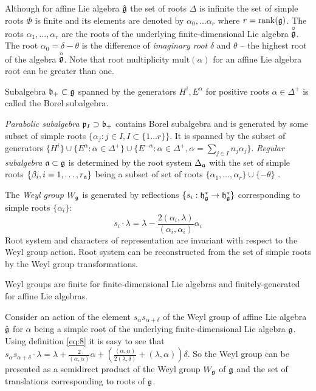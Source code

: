 Although for affine Lie algebra $\hat{\mathfrak{g}}$ the set of roots $\Delta$ is infinite the set of simple roots $\Phi$ is finite and its elements are denoted by $\alpha_{0},\dots \alpha_{r}$ where $r=\mathrm{rank}(\mathfrak{g})$. The roots $\alpha_1,\dots, \alpha_r$ are the roots of the underlying finite-dimensional Lie algebra $\stackrel{\circ }{\mathfrak{g}}$. The root $\alpha_0=\delta-\theta$ is the difference of {\it imaginary root} $\delta$ and $\theta$ -- the highest root of the algebra $\stackrel{\circ }{\mathfrak{g}}$.
Note that root multiplicity $\mathrm{mult}(\alpha)$ for an affine Lie algebra root can be greater than one.

Subalgebra  $\mathfrak{b}_{+}\subset \mathfrak{g}$ spanned by the generators $H^{i}, E^{\alpha}$ for positive roots $\alpha\in \Delta^{+}$ is called the Borel subalgebra.

{\it Parabolic subalgebra}  $\mathfrak{p}_{I}\supset \mathfrak{b}_{+}$ contains Borel subalgebra and is  generated by some subset of simple roots $\{\alpha_{j}:j\in I, I\subset \{1\dots r\}\}$. It is spanned by the subset of generators $\{H^{i}\}\cup \{E^{\alpha}:\alpha\in \Delta^{+}\}\cup \{E^{-\alpha}: \alpha\in\Delta^{+}, \alpha=\sum_{j\in I} n_{j} \alpha_{j}\}$.
{\it Regular subalgebra} $\mathfrak{a}\subset\mathfrak{g}$ is determined by the root system $\Delta_{\mathfrak{a}}$ with the set of simple roots $\{\beta_{i}, i=1,\dots,r_{\mathfrak{a}}\}$ being a subset of set of roots $\{\alpha_{1},\dots,\alpha_{r}\}\cup \{-\theta\}$ .

The {\it Weyl group} $W_{\mathfrak{g}}$ is generated by reflections $\{s_{i}:\mathfrak{h}_{\mathfrak{g}}^{*}\to\mathfrak{h}_{\mathfrak{g}}^{*}\}$ corresponding to simple roots $\{\alpha_{i}\}$:
\begin{equation}
  \label{eq:8}
  s_{i}\cdot\lambda=\lambda-\frac{2(\alpha_{i},\lambda)}{(\alpha_{i},\alpha_{i})}\alpha_{i}
\end{equation}
Root system and characters of representation are invariant with respect to the Weyl group  action. Root system can be reconstructed from the set of simple roots by the Weyl group transformations.

Weyl groups are finite for finite-dimensional Lie algebras and finitely-generated for affine Lie algebras.

Consider an action of the element $s_{\alpha}s_{\alpha+\delta}$ of the Weyl group of affine Lie algebra  $\hat{\mathfrak{g}}$ for $\alpha$ being a simple root of the underlying finite-dimensional Lie algebra $\mathfrak{g}$. Using definition \eqref{eq:8} it is easy to see that $s_{\alpha}s_{\alpha+\delta} \cdot \lambda=\lambda+\frac{2}{(\alpha,\alpha)}\alpha+\left(\frac{(\alpha,\alpha)}{2 (\lambda,\delta)}+(\lambda,\alpha)\right) \delta$. So the Weyl group can be presented as a semidirect product of the Weyl group $W_{\mathfrak{g}}$ of $\mathfrak{g}$ and the set of translations corresponding to roots of $\mathfrak{g}$. 

